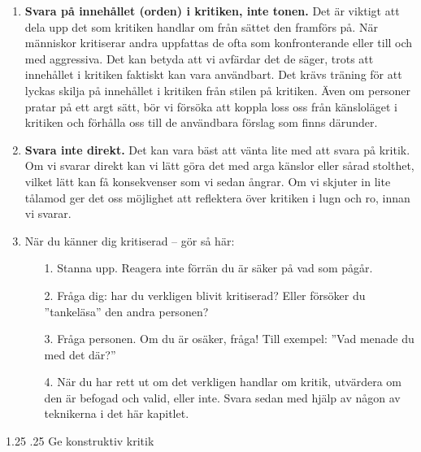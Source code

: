 \documentclass[swedish,a4paper]{book}
\makeatletter
\renewcommand\section{\@startsection{section}{1}{\z@}%
                                   {1.25\baselineskip}%
                                   {.25\baselineskip}%
                                   {\fontsize{1.25\baselineskip}{1.25\baselineskip}\selectfont\sffamily\bfseries}} %
\makeatother
\begin{document}
\begin{enumerate}

\item \textbf{Svara på innehållet (orden) i kritiken, inte tonen.} Det är viktigt att dela upp det som kritiken handlar om från sättet den framförs på. När människor kritiserar andra uppfattas de ofta som konfronterande eller till och med aggressiva. Det kan betyda att vi avfärdar det de säger, trots att innehållet i kritiken faktiskt kan vara användbart. Det krävs träning för att lyckas skilja på innehållet i kritiken från stilen på kritiken. Även om personer pratar på ett argt sätt, bör vi försöka att koppla loss oss från känsloläget i kritiken och förhålla oss till de användbara förslag som finns därunder.

\item \textbf{Svara inte direkt.} Det kan vara bäst att vänta lite med att svara på kritik. Om vi svarar direkt kan vi lätt göra det med arga känslor eller sårad stolthet, vilket lätt kan få konsekvenser som vi sedan ångrar. Om vi skjuter in lite tålamod ger det oss möjlighet att reflektera över kritiken i lugn och ro, innan vi svarar.

\item När du känner dig kritiserad -- gör så här:

\begin{enumerate}

\item[1.] Stanna upp. Reagera inte förrän du är säker på vad som pågår.

\item[2.] Fråga dig: har du verkligen blivit kritiserad? Eller försöker du ''tankeläsa'' den andra personen?

\item[3.] Fråga personen. Om du är osäker, fråga! Till exempel: ''Vad menade du med det där?''

\item[4.] När du har rett ut om det verkligen handlar om kritik, utvärdera om den är befogad och valid, eller inte. Svara sedan med hjälp av någon av teknikerna i det här kapitlet.

\end{enumerate}

\end{enumerate}

\section{Ge konstruktiv kritik}
\end{document}
